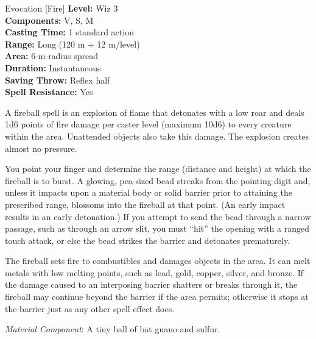 {Evocation [Fire]}
{
	\textbf{Level:}
	Wiz 3\\
	\textbf{Components:}
	V, S, M\\
	\textbf{Casting Time:}
	1 standard action\\
	\textbf{Range:}
	Long (120 m + 12 m/level)\\
	\textbf{Area:}
	6-m-radius spread\\
	\textbf{Duration:}
	Instantaneous\\
	\textbf{Saving Throw:}
	Reflex half\\
	\textbf{Spell Resistance:}
	Yes\\
}
{
	A fireball spell is an explosion of flame that detonates with a low roar and deals 1d6 points of fire damage per caster level (maximum 10d6) to every creature within the area. Unattended objects also take this damage. The explosion creates almost no pressure.

	You point your finger and determine the range (distance and height) at which the fireball is to burst. A glowing, pea-sized bead streaks from the pointing digit and, unless it impacts upon a material body or solid barrier prior to attaining the prescribed range, blossoms into the fireball at that point. (An early impact results in an early detonation.) If you attempt to send the bead through a narrow passage, such as through an arrow slit, you must ``hit'' the opening with a ranged touch attack, or else the bead strikes the barrier and detonates prematurely.

	The fireball sets fire to combustibles and damages objects in the area. It can melt metals with low melting points, such as lead, gold, copper, silver, and bronze. If the damage caused to an interposing barrier shatters or breaks through it, the fireball may continue beyond the barrier if the area permits; otherwise it stops at the barrier just as any other spell effect does.

	\textit{Material Component}:
	A tiny ball of bat guano and sulfur.

}
